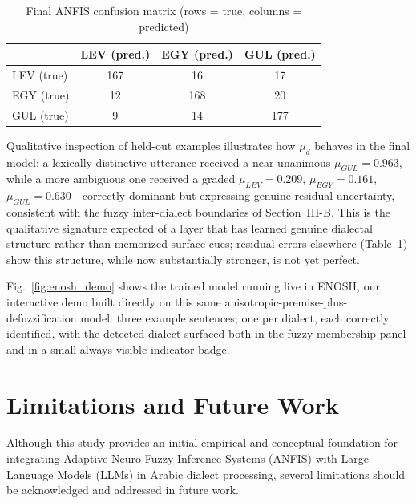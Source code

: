 \documentclass[conference]{IEEEtran}
\begin{document}
\begin{table}[t]
\centering
\caption{Final ANFIS confusion matrix (rows = true, columns = predicted)}
\label{tab:confusion}
\begin{tabular}{lccc}
\toprule
 & LEV (pred.) & EGY (pred.) & GUL (pred.) \\
\midrule
LEV (true) & 167 & 16 & 17 \\
EGY (true) & 12 & 168 & 20 \\
GUL (true) & 9 & 14 & 177 \\
\bottomrule
\end{tabular}
\end{table}

Qualitative inspection of held-out examples illustrates how $\mu_d$ behaves in the final model: a lexically distinctive utterance received a near-unanimous $\mu_{GUL}=0.963$, while a more ambiguous one received a graded $\mu_{LEV}=0.209$, $\mu_{EGY}=0.161$, $\mu_{GUL}=0.630$---correctly dominant but expressing genuine residual uncertainty, consistent with the fuzzy inter-dialect boundaries of Section~III-B. This is the qualitative signature expected of a layer that has learned genuine dialectal structure rather than memorized surface cues; residual errors elsewhere (Table~\ref{tab:confusion}) show this structure, while now substantially stronger, is not yet perfect.

Fig.~\ref{fig:enosh_demo} shows the trained model running live in ENOSH, our interactive demo built directly on this same anisotropic-premise-plus-defuzzification model: three example sentences, one per dialect, each correctly identified, with the detected dialect surfaced both in the fuzzy-membership panel and in a small always-visible indicator badge.

\section{Limitations and Future Work}
Although this study provides an initial empirical and conceptual foundation for integrating Adaptive Neuro-Fuzzy Inference Systems (ANFIS) with Large Language Models (LLMs) in Arabic dialect processing, several limitations should be acknowledged and addressed in future work.
\end{document}
